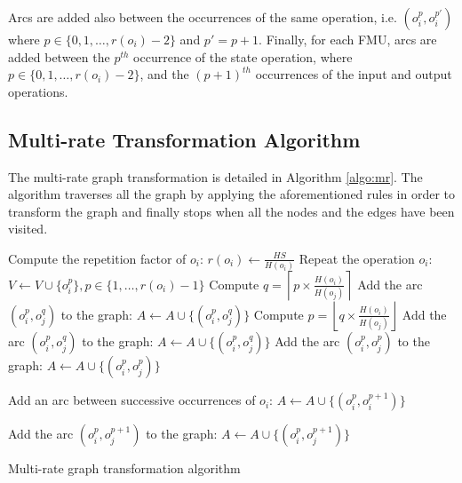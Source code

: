 Arcs are added also between the occurrences of the same operation, i.e. $(o_i^p,o_i^{p'})$ where $p \in \{0,1, \dots ,r(o_i)-2\}$ and $p' = p + 1$. Finally, for each FMU, arcs are added between the $p^{th}$ occurrence of the state operation, where $p \in \{0,1, \dots ,r(o_i)-2\}$, and the $(p+1)^{th}$ occurrences of the input and output operations. 

\subsection{Multi-rate Transformation Algorithm}

The multi-rate graph transformation is detailed in Algorithm \ref{algo:mr}. The algorithm traverses all the graph by applying the aforementioned rules in order to transform the graph and finally stops when all the nodes and the edges have been visited.

\begin{algorithm}[!htp]
		{
			Compute the repetition factor of $o_i$: $r(o_i) \leftarrow \frac{HS}{H(o_i)}$\;
			Repeat the operation $o_i$: $V \leftarrow V \cup \{o_i^p\}, p \in \{1, \dots,r(o_i)-1\}$\;
		}
		{
			{
					{
						Compute $q = \left \lceil{p \times \frac{H(o_i)}{H(o_j)}}\right \rceil$\;
						Add the arc $(o_i^p,o_j^q)$ to the graph: $A \leftarrow A \cup \{(o_i^p,o_j^q)\}$\;
					}
			}
			{
					{
						Compute $p = \left \lfloor{q \times \frac{H(o_i)}{H(o_j)}}\right \rfloor$\;
						Add the arc $(o_i^p,o_j^q)$ to the graph: $A \leftarrow A \cup \{(o_i^p,o_j^q)\}$\;
					}
			}
			\Else
			{
					{
					  Add the arc $(o_i^p,o_j^p)$ to the graph: $A \leftarrow A \cup \{(o_i^p,o_j^p)\}$\;
					}
			}
		}
		{
			{
				 Add an arc between successive occurrences of $o_i$: $A \leftarrow A \cup \{(o_i^p,o_i^{p+1})\}$\;
			}
			
		}
		{
					{
						{
							Add the arc $(o_i^p,o_j^{p+1})$ to the graph: $A \leftarrow A \cup \{(o_i^p,o_j^{p+1})\}$\;
						}
					
					}
		}
	\caption{Multi-rate graph transformation algorithm}
	\label{algo:mr}
\end{algorithm}

